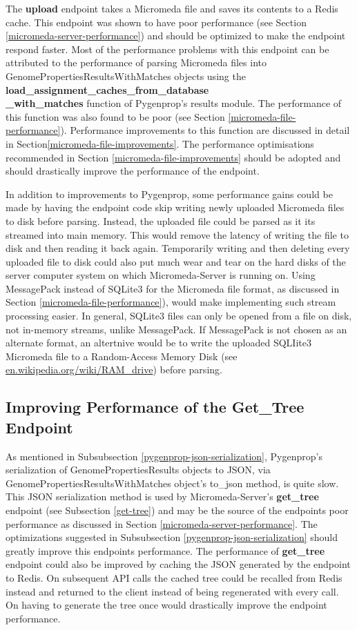 The \textbf{upload} endpoint takes a Micromeda file and saves its contents to a Redis cache. This endpoint was shown to have poor performance (see Section \ref{micromeda-server-performance}) and should be optimized to make the endpoint respond faster. Most of the performance problems with this endpoint can be attributed to the performance of parsing Micromeda files into GenomePropertiesResultsWithMatches objects using the \textbf{load\_assignment\_caches\_from\_database \\ \_with\_matches} function of Pygenprop's results module. The performance of this function was also found to be poor (see Section \ref{micromeda-file-performance}). Performance improvements to this function are discussed in detail in Section\ref{micromeda-file-improvements}. The performance optimisations recommended in Section \ref{micromeda-file-improvements} should be adopted and should drastically improve the performance of the endpoint. 

In addition to improvements to Pygenprop, some performance gains could be made by having the endpoint code skip writing newly uploaded Micromeda files to disk before parsing. Instead, the uploaded file could be parsed as it its streamed into main memory. This would remove the latency of writing the file to disk and then reading it back again. Temporarily writing and then deleting every uploaded file to disk could also put much wear and tear on the hard disks of the server computer system on which Micromeda-Server is running on. Using MessagePack instead of SQLite3 for the Micromeda file format, as discussed in Section \ref{micromeda-file-performance}), would make implementing such stream processing easier. In general, SQLite3 files can only be opened from a file on disk, not in-memory streams, unlike MessagePack. If MessagePack is not chosen as an alternate format, an altertnive would be to write the uploaded SQLIite3 Micromeda file to a Random-Access Memory Disk (see \href{en.wikipedia.org/wiki/RAM\_drive}{en.wikipedia.org/wiki/RAM\_drive}) before parsing.

\subsection{Improving Performance of the Get_Tree Endpoint}

As mentioned in Subsubsection \ref{pygenprop-json-serialization}, Pygenprop's serialization of GenomePropertiesResults objects to JSON, via GenomePropertiesResultsWithMatches object's to_json method, is quite slow. This JSON serialization method is used by Micromeda-Server's \textbf{get_tree} endpoint (see Subsection \ref{get-tree}) and may be the source of the endpoints poor performance as discussed in Section \ref{micromeda-server-performance}. The optimizations suggested in Subsubsection \ref{pygenprop-json-serialization} should greatly improve this endpoints performance. The performance of \textbf{get_tree} endpoint could also be improved by caching the JSON generated by the endpoint to Redis. On subsequent API calls the cached tree could be recalled from Redis instead and returned to the client instead of being regenerated with every call. On having to generate the tree once would drastically improve the endpoint performance.

